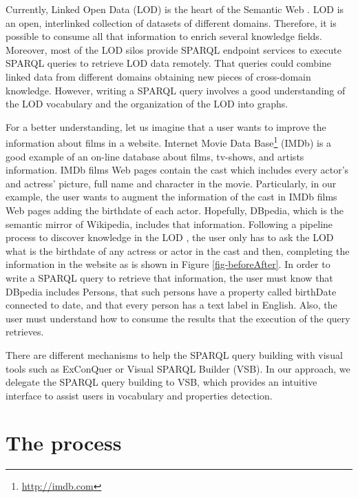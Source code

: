 \documentclass[runningheads]{llncs}
\begin{document}
Currently, Linked Open Data (LOD) is the heart of the Semantic Web \cite{Bizer2009}. LOD is an open, interlinked collection of datasets of different domains.  Therefore, it is possible to consume all that information to enrich several knowledge fields. Moreover, most of the LOD silos provide SPARQL endpoint services to execute SPARQL queries to retrieve LOD data remotely.  That queries could combine linked data from different domains obtaining new pieces of cross-domain knowledge. However, writing a SPARQL query involves a good understanding of the LOD vocabulary and the organization of the LOD into graphs. 

For a better understanding,  let us imagine that a user wants to improve the information about films in a website. Internet Movie Data Base\footnote{\url{http://imdb.com}} (IMDb) is a good example of an on-line database about films, tv-shows, and artists information. IMDb films Web pages contain the cast which includes every actor's and actress' picture, full name and character in the movie. Particularly, in our example, the user wants to augment the information of the cast in IMDb films Web pages adding the birthdate of each actor. Hopefully, DBpedia, which is the semantic mirror of Wikipedia, includes that information. Following a pipeline process to discover knowledge in the LOD \cite{RISTOSKI20161}, the user only has to ask the LOD what is the birthdate of any actress or actor in the cast and then, completing the information in the website as is shown in Figure \ref{fig-beforeAfter}. In order to write a SPARQL query to retrieve that information, the user must know that DBpedia includes Persons, that such persons have a property called birthDate connected to date, and that every person has a text label in English. Also, the user must understand how to consume the results that the execution of the query retrieves.

There are different mechanisms to help the SPARQL query building with visual tools such as ExConQuer\cite{Attard2017ExConQuerRe-use} or Visual SPARQL Builder (VSB)\cite{mci/Eipert2015}. In our approach, we delegate the SPARQL query building to VSB, which provides an intuitive interface to assist users in vocabulary and properties detection.


\section{The process}
\label{sec-process}
\end{document}
